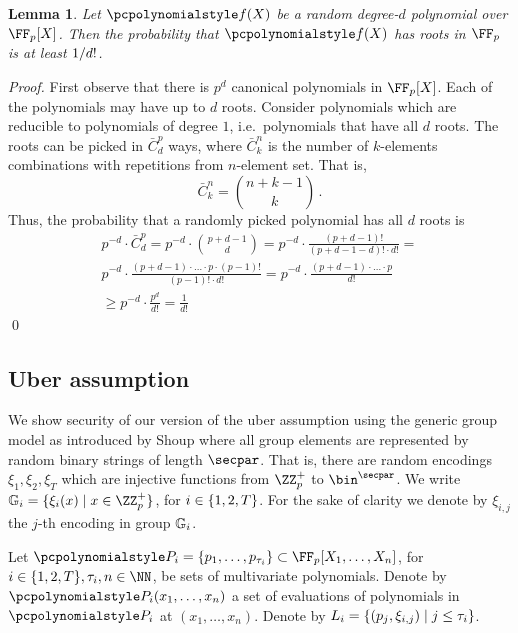\documentclass[runningheads,11pt]{llncs}
\newtheorem{lemma}[theorem]{Lemma} \newtheorem{corollary}[theorem]{Corollary}
\theoremstyle{definition} \newtheorem{definition}[theorem]{Definition}
\begin{document}
\begin{lemma}
  \label{lem:root_prob}
  Let $\p{f}(X)$ be a random degree-$d$ polynomial over $\FF_p[X]$. Then the
  probability that $\p{f}(X)$ has roots in $\FF_p$ is at least $1 / d!$.
\end{lemma}
\begin{proof}
  First observe that there is $p^{d}$ canonical polynomials in $\FF_p[X]$.  Each
  of the polynomials may have up to $d$ roots. Consider polynomials which are
  reducible to polynomials of degree $1$, i.e.~polynomials that have all $d$
  roots. The roots can be picked in $\bar{C}^{p}_{d}$ ways, where
  $\bar{C}^{n}_{k}$ is the number of $k$-elements combinations with repetitions
  from $n$-element set. That is,
  \[
    \bar{C}^n_k = \binom{n + k - 1}{k}\,.
  \]
  Thus, the probability that a randomly picked polynomial has all $d$ roots is
  \begin{multline*}
    p^{-d} \cdot \bar{C}^p_d = p^{-d} \cdot \binom{p + d - 1}{d} =
    p^{-d} \cdot \frac{(p + d - 1)!}{(p + d - 1 - d)! \cdot d!} = \\
    p^{-d} \cdot \frac{(p + d - 1) \cdot \ldots \cdot p \cdot (p - 1)!}{(p - 1)!
      \cdot d!} = p^{-d} \cdot \frac{(p + d - 1)\cdot
      \ldots \cdot p}{d!} \\
    \geq p^{-d} \cdot {\frac{p^d}{d!}} = \frac{1}{d!}
  \end{multline*}
  \qed
\end{proof}

\subsection{Uber assumption}
\label{sec:uber_assumption}
We show security of our version of the uber assumption using the generic group
model as introduced by Shoup \cite{EC:Shoup97} where all group elements are
represented by random binary strings of length $\secpar$. That is, there are
random encodings $\xi_1, \xi_2, \xi_T$ which are injective functions from
$\ZZ_p^+$ to $\bin^{\secpar}$. We write
$\GRP_i = \smallset{\xi_i(x) \mid x \in \ZZ_p^+}$, for
$i \in \{1, 2, T\}$. For the sake of clarity  we denote by $\xi_{i, j}$
the $j$-th encoding in group $\mathbb{G}_i$.

Let
$\p{P}_i = \smallset{p_1, \ldots, p_{\tau_i}} \subset \FF_p[X_1, \ldots, X_n]$,
for $i \in \smallset{1, 2, T}, \tau_i, n \in \NN$, be sets of multivariate
polynomials. Denote by $\p{P}_i(x_1, \ldots, x_n)$ a set of evaluations of
polynomials in $\p{P_i}$ at $(x_1, \ldots, x_n)$. Denote by
$L_i = \{(p_j, \xi_{i, j}) \mid j \leq \tau_i\}$.
\end{document}
